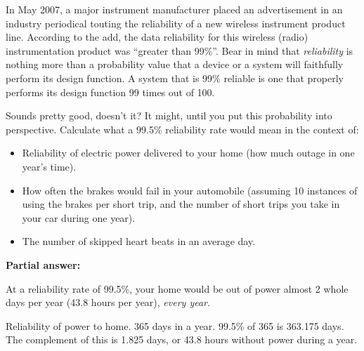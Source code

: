 

In May 2007, a major instrument manufacturer placed an advertisement in an industry periodical touting the reliability of a new wireless instrument product line.  According to the add, the data reliability for this wireless (radio) instrumentation product was ``greater than 99\%''.  Bear in mind that {\it reliability} is nothing more than a probability value that a device or a system will faithfully perform its design function.  A system that is 99\% reliable is one that properly performs its design function 99 times out of 100.

\vskip 10pt

Sounds pretty good, doesn't it?  It might, until you put this probability into perspective.  Calculate what a 99.5\% reliability rate would mean in the context of:

\begin{itemize}
\item{} Reliability of electric power delivered to your home (how much outage in one year's time).
\item{} How often the brakes would fail in your automobile (assuming 10 instances of using the brakes per short trip, and the number of short trips you take in your car during one year).
\item{} The number of skipped heart beats in an average day.
\end{itemize}







\noindent
{\bf Partial answer:}

\vskip 10pt

At a reliability rate of 99.5\%, your home would be out of power almost 2 whole days per year (43.8 hours per year), {\it every year}.







Reliability of power to home.  365 days in a year.  99.5\% of 365 is 363.175 days.  The complement of this is 1.825 days, or 43.8 hours without power during a year.

